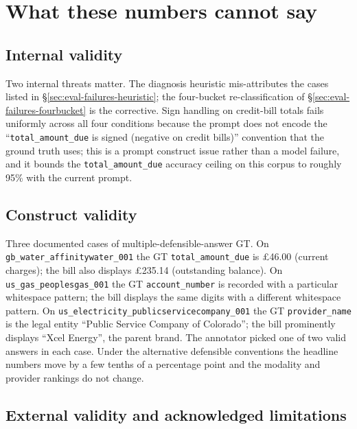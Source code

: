 \section{What these numbers cannot say}
\label{sec:eval-validity}

\subsection{Internal validity}
\label{sec:eval-validity-internal}

Two internal threats matter. The diagnosis heuristic mis-attributes
the cases listed in \S\ref{sec:eval-failures-heuristic}; the
four-bucket re-classification of
\S\ref{sec:eval-failures-fourbucket} is the corrective. Sign
handling on credit-bill totals fails uniformly across all four
conditions because the prompt does not encode the
``\texttt{total\_amount\_due} is signed (negative on credit
bills)'' convention that the ground truth uses; this is a prompt
construct issue rather than a model failure, and it bounds the
\texttt{total\_amount\_due} accuracy ceiling on this corpus to
roughly 95\% with the current prompt.

\subsection{Construct validity}
\label{sec:eval-validity-construct}

Three documented cases of multiple-defensible-answer GT. On
\texttt{gb\_water\_affinitywater\_001} the GT \texttt{total\_amount\_due}
is \pounds46.00 (current charges); the bill also displays
\pounds235.14 (outstanding balance). On
\texttt{us\_gas\_peoplesgas\_001} the GT \texttt{account\_number}
is recorded with a particular whitespace pattern; the bill displays
the same digits with a different whitespace pattern. On
\texttt{us\_electricity\_publicservicecompany\_001} the GT
\texttt{provider\_name} is the legal entity ``Public Service Company
of Colorado''; the bill prominently displays ``Xcel Energy'', the
parent brand. The annotator picked one of two valid answers in
each case. Under the alternative defensible conventions the headline
numbers move by a few tenths of a percentage point and the modality
and provider rankings do not change.

\subsection{External validity and acknowledged limitations}
\label{sec:eval-validity-external}

